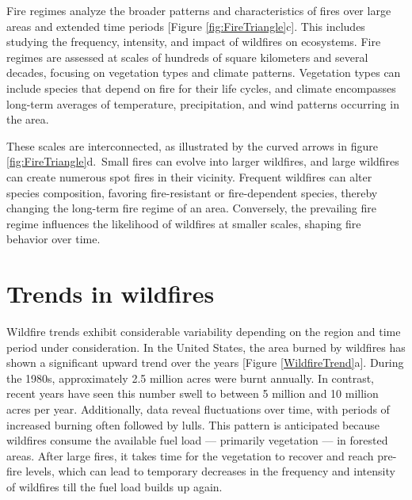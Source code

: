 \documentclass[
  12 pt,
]{Nemilov}
\begin{document}
Fire regimes analyze the broader patterns and characteristics of fires over large areas and extended time periods {[}Figure \ref{fig:FireTriangle}c{]}. This includes studying the frequency, intensity, and impact of wildfires on ecosystems. Fire regimes are assessed at scales of hundreds of square kilometers and several decades, focusing on vegetation types and climate patterns. Vegetation types can include species that depend on fire for their life cycles, and climate encompasses long-term averages of temperature, precipitation, and wind patterns occurring in the area.

These scales are interconnected, as illustrated by the curved arrows in figure \ref{fig:FireTriangle}d.~Small fires can evolve into larger wildfires, and large wildfires can create numerous spot fires in their vicinity. Frequent wildfires can alter species composition, favoring fire-resistant or fire-dependent species, thereby changing the long-term fire regime of an area. Conversely, the prevailing fire regime influences the likelihood of wildfires at smaller scales, shaping fire behavior over time.

\section{Trends in wildfires}\label{trends-in-wildfires}

Wildfire trends exhibit considerable variability depending on the region and time period under consideration. In the United States, the area burned by wildfires has shown a significant upward trend over the years {[}Figure \ref{WildfireTrend}a{]}. During the 1980s, approximately 2.5 million acres were burnt annually. In contrast, recent years have seen this number swell to between 5 million and 10 million acres per year. Additionally, data reveal fluctuations over time, with periods of increased burning often followed by lulls. This pattern is anticipated because wildfires consume the available fuel load --- primarily vegetation --- in forested areas. After large fires, it takes time for the vegetation to recover and reach pre-fire levels, which can lead to temporary decreases in the frequency and intensity of wildfires till the fuel load builds up again.
\end{document}
